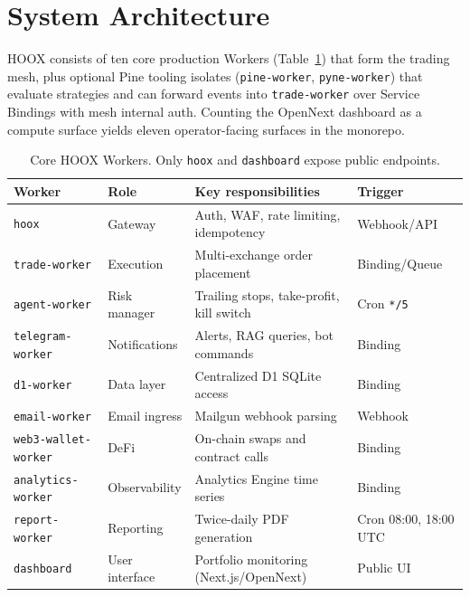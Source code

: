 \section{System Architecture}
\label{sec:architecture}

\textsc{HOOX} consists of ten core production Workers (Table~\ref{tab:workers}) that form the trading mesh, plus optional Pine tooling isolates (\texttt{pine-worker}, \texttt{pyne-worker}) that evaluate strategies and can forward events into \texttt{trade-worker} over Service Bindings with mesh internal auth. Counting the OpenNext dashboard as a compute surface yields eleven operator-facing surfaces in the monorepo.

\begin{table}[t]
  \centering
  \caption{Core \textsc{HOOX} Workers. Only \texttt{hoox} and \texttt{dashboard} expose public endpoints.}
  \label{tab:workers}
  \small
  \begin{tabular*}{\linewidth}{@{\extracolsep{\fill}}llp{5.5cm}l@{}}
    \toprule
    \textbf{Worker} & \textbf{Role} & \textbf{Key responsibilities} & \textbf{Trigger} \\
    \midrule
    \texttt{hoox} & Gateway & Auth, WAF, rate limiting, idempotency & Webhook/API \\
    \texttt{trade-worker} & Execution & Multi-exchange order placement & Binding/Queue \\
    \texttt{agent-worker} & Risk manager & Trailing stops, take-profit, kill switch & Cron \texttt{*/5} \\
    \texttt{telegram-worker} & Notifications & Alerts, RAG queries, bot commands & Binding \\
    \texttt{d1-worker} & Data layer & Centralized D1 SQLite access & Binding \\
    \texttt{email-worker} & Email ingress & Mailgun webhook parsing & Webhook \\
    \texttt{web3-wallet-worker} & DeFi & On-chain swaps and contract calls & Binding \\
    \texttt{analytics-worker} & Observability & Analytics Engine time series & Binding \\
    \texttt{report-worker} & Reporting & Twice-daily PDF generation & Cron 08:00, 18:00 UTC \\
    \texttt{dashboard} & User interface & Portfolio monitoring (Next.js/OpenNext) & Public UI \\
    \bottomrule
  \end{tabular*}
\end{table}

